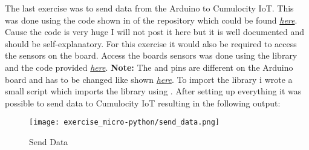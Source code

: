 The last exercise was to send data from the Arduino to Cumulocity IoT. This was done using the code 
shown in  of the repository which could be found \href{https://github.com/Smokey95/AIN_Ubiquitous_Computing/tree/main/exercise/sheet%202}{\textit{here}}.
Cause the code is very huge I will not post it here but it is well documented and should be self-explanatory.
\newline
\newline
For this exercise it would also be required to access the sensors on the board.
Access the boards sensors was done using the  library and the code 
provided \href{https://micropython-lsm6dsox.readthedocs.io/en/latest/examples.html}{\textit{here}}.
\textbf{Note:} The  and  pins are different on the Arduino board and has to 
be changed like shown \href{https://docs.arduino.cc/tutorials/nano-rp2040-connect/rp2040-openmv-mlc}{\textit{here}}.
To import the library i wrote a small script  which imports the library using .
\newline
\newline
After setting up everything it was possible to send data to Cumulocity IoT resulting in the following output:
\begin{figure}[H]
  \centering
  \texttt{[image: exercise\_micro-python/send\_data.png]}
  \caption{Send Data}
\end{figure}